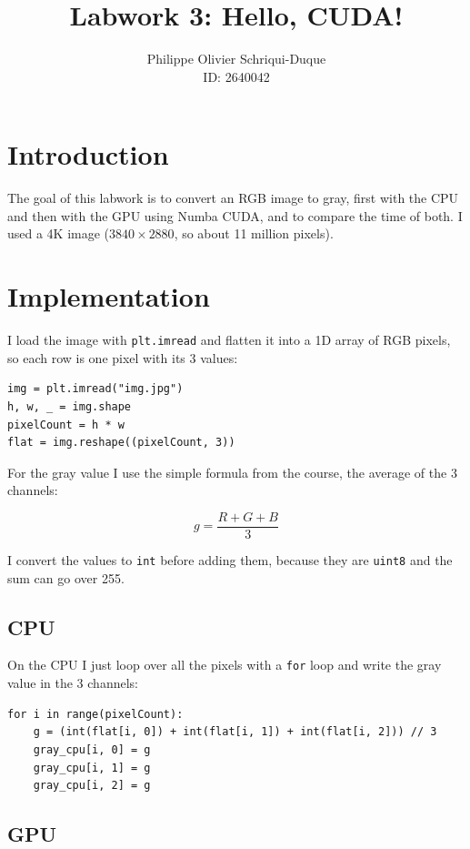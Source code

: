 \documentclass{report}
\begin{document}
\title{Labwork 3: Hello, CUDA!}
\author{Philippe Olivier Schriqui-Duque \\ ID: 2640042}
\date{}
\maketitle

\section*{Introduction}

The goal of this labwork is to convert an RGB image to gray, first with the CPU and then with
the GPU using Numba CUDA, and to compare the time of both. I used a 4K image
($3840 \times 2880$, so about 11 million pixels).

\section*{Implementation}

I load the image with \texttt{plt.imread} and flatten it into a 1D array of RGB pixels, so
each row is one pixel with its 3 values:

\begin{verbatim}
img = plt.imread("img.jpg")
h, w, _ = img.shape
pixelCount = h * w
flat = img.reshape((pixelCount, 3))
\end{verbatim}

For the gray value I use the simple formula from the course, the average of the 3 channels:

\[
g = \frac{R + G + B}{3}
\]

I convert the values to \texttt{int} before adding them, because they are \texttt{uint8} and
the sum can go over 255.

\subsection*{CPU}

On the CPU I just loop over all the pixels with a \texttt{for} loop and write the gray value
in the 3 channels:

\begin{verbatim}
for i in range(pixelCount):
    g = (int(flat[i, 0]) + int(flat[i, 1]) + int(flat[i, 2])) // 3
    gray_cpu[i, 0] = g
    gray_cpu[i, 1] = g
    gray_cpu[i, 2] = g
\end{verbatim}

\subsection*{GPU}
\end{document}
